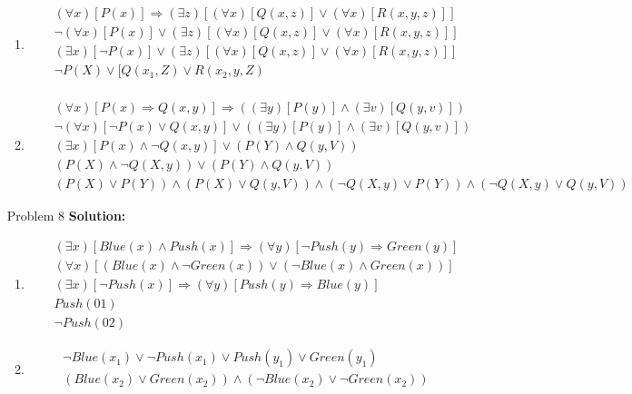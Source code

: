 \normalfont\documentclass[letterpaper,11pt]{article}
\begin{document}
\begin{enumerate}
\begin{enumerate}
	\item 
	\begin{eqnarray*}
	&&(\forall x)[P(x)] \Rightarrow (\exists z)[(\forall x)[Q(x,z)] \lor (\forall x)[R(x,y,z)]]\\
	&&\neg (\forall x)[P(x)] \lor (\exists z)[(\forall x)[Q(x,z)] \lor (\forall x)[R(x,y,z)]]\\
	&&(\exists x) [\neg P(x)] \lor (\exists z)[(\forall x)[Q(x,z)] \lor (\forall x)[R(x,y,z)]]\\
	&&\neg P(X) \lor [Q(x_1,Z) \lor R(x_2,y,Z)\\
	\end{eqnarray*}
	\item 
	\begin{eqnarray*}
		&& (\forall x)[P(x) \Rightarrow Q(x,y)] \Rightarrow ((\exists y)[P(y)] \land (\exists v)[Q(y,v)])\\
		&& \neg (\forall x)[\neg P(x) \lor Q(x,y)] \lor ((\exists y)[P(y)] \land (\exists v)[Q(y,v)])\\
		&& (\exists x)[ P(x) \land \neg Q(x,y)] \lor (P(Y) \land Q(y,V))\\
		&& (P(X) \land \neg Q(X,y)) \lor (P(Y) \land Q(y,V))\\
		&& (P(X) \lor P(Y)) \land (P(X) \lor Q(y,V))  \land (\neg Q(X,y) \lor P(Y)) \land (\neg Q(X,y) \lor Q(y,V))
	\end{eqnarray*}
\end{enumerate}
\item[Problem 8]\textbf{Solution:}\par
\begin{enumerate}
	\item
		\begin{eqnarray*} 
		&&(\exists x)[Blue(x)\land Push(x)] \Rightarrow (\forall y)[\neg Push(y)\Rightarrow Green(y)]\\
		&&(\forall x)[(Blue(x)\land \neg Green(x)) \lor (\neg Blue(x) \land Green(x)) ]\\
		&&(\exists x)[\neg Push(x)] \Rightarrow (\forall y)[Push(y)\Rightarrow Blue(y)]\\
		&&Push(01)\\
		&&\neg Push(02)
		\end{eqnarray*}
	\item
	\begin{eqnarray*} 
		&&\neg Blue(x_1)\lor \neg Push(x_1) \lor Push(y_1) \lor Green(y_1)\\
		&&(Blue(x_2)\lor Green(x_2)) \land (\neg Blue(x_2) \lor \neg Green(x_2))\\

\end{eqnarray*}
\end{enumerate}
\end{enumerate}
\end{document}
